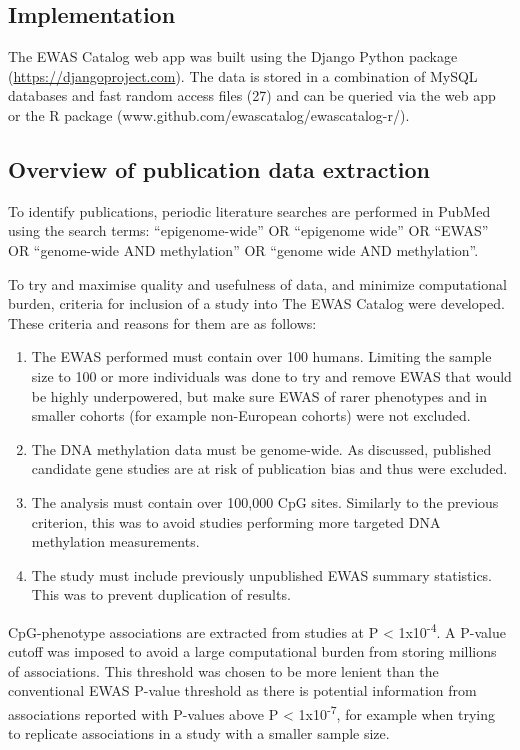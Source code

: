 \documentclass[11pt,oneside]{bristolthesis}
\providecommand{\tightlist}{%
  \setlength{\itemsep}{0pt}\setlength{\parskip}{0pt}}
\begin{document}
\hypertarget{implementation}{%
\subsection{Implementation}\label{implementation}}

The EWAS Catalog web app was built using the Django Python package (\url{https://djangoproject.com}). The data is stored in a combination of MySQL databases and fast random access files (27) and can be queried via the web app or the R package (www.github.com/ewascatalog/ewascatalog-r/).

\hypertarget{overview-of-publication-data-extraction}{%
\subsection{Overview of publication data extraction}\label{overview-of-publication-data-extraction}}

To identify publications, periodic literature searches are performed in PubMed using the search terms: ``epigenome-wide'' OR ``epigenome wide'' OR ``EWAS'' OR ``genome-wide AND methylation'' OR ``genome wide AND methylation''.

To try and maximise quality and usefulness of data, and minimize computational burden, criteria for inclusion of a study into The EWAS Catalog were developed. These criteria and reasons for them are as follows:
\begin{enumerate}
\def\labelenumi{\arabic{enumi}.}
\tightlist
\item
  The EWAS performed must contain over 100 humans. Limiting the sample size to 100 or more individuals was done to try and remove EWAS that would be highly underpowered, but make sure EWAS of rarer phenotypes and in smaller cohorts (for example non-European cohorts) were not excluded.
\item
  The DNA methylation data must be genome-wide. As discussed, published candidate gene studies are at risk of publication bias and thus were excluded.
\item
  The analysis must contain over 100,000 CpG sites. Similarly to the previous criterion, this was to avoid studies performing more targeted DNA methylation measurements.
\item
  The study must include previously unpublished EWAS summary statistics. This was to prevent duplication of results.
\end{enumerate}
CpG-phenotype associations are extracted from studies at P \textless{} 1x10\textsuperscript{-4}. A P-value cutoff was imposed to avoid a large computational burden from storing millions of associations. This threshold was chosen to be more lenient than the conventional EWAS P-value threshold as there is potential information from associations reported with P-values above P \textless{} 1x10\textsuperscript{-7}, for example when trying to replicate associations in a study with a smaller sample size.
\end{document}
